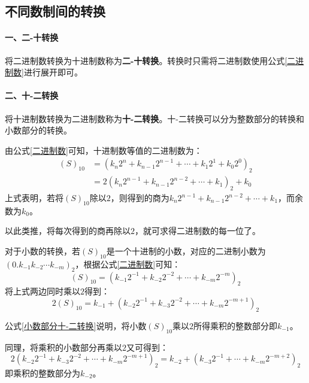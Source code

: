 \subsection{不同数制间的转换}

\paragraph{一、二-十转换}
将二进制数转换为十进制数称为\textbf{二-十转换}。转换时只需将二进制数使用公式\ref{二进制数}进行展开即可。

\paragraph{二、十-二转换}
将十进制数转换为二进制数称为\textbf{十-二转换}。十-二转换可以分为整数部分的转换和小数部分的转换。

由公式\ref{二进制数}可知，十进制数等值的二进制数为：
\begin{equation}
    \begin{aligned}
        \left( S \right)_{10} & = \left( k_{n}2^{n} + k_{n-1}2^{n-1} + \cdots + k_{1}2^{1} + k_{0}2^{0} \right)_{2} \\
                              & = 2\left( k_{n}2^{n-1} + k_{n-1}2^{n-2} + \cdots + k_{1} \right)_{2} + k_{0}
    \end{aligned}
\end{equation}
上式表明，若将$ \left( S \right)_{10} $除以$ 2 $，则得到的商为$ k_{n}2^{n-1} + k_{n-1}2^{n-2} + \cdots + k_{1} $，而余数为$ k_{0} $。

以此类推，将每次得到的商再除以$ 2 $，就可求得二进制数的每一位了。

对于小数的转换，若$ \left( S \right)_{10} $是一个十进制的小数，对应的二进制小数为$ \left( 0.k_{-1}k_{-2}\cdots k_{-m} \right)_{2} $，根据公式\ref{二进制数}可知：
\begin{equation}
    \left( S \right)_{10} = \left( k_{-1}2^{-1} + k_{-2}2^{-2} + \cdots + k_{-m}2^{-m} \right)_{2}
\end{equation}
将上式两边同时乘以$ 2 $得到：
\begin{equation}
    2\left( S \right)_{10} = k_{-1} + \left( k_{-2}2^{-1} + k_{-3}2^{-2} + \cdots + k_{-m}2^{-m+1} \right)_{2}
    \label{小数部分十-二转换}
\end{equation}

公式\ref{小数部分十-二转换}说明，将小数$ \left( S \right)_{10} $乘以$ 2 $所得乘积的整数部分即$ k_{-1} $。

同理，将乘积的小数部分再乘以$ 2 $又可得到：
\begin{equation}
    2 \left( k_{-2}2^{-1} + k_{-3}2^{-2} + \cdots + k_{-m}2^{-m+1} \right)_{2} = k_{-2} + \left( k_{-3}2^{-1} + \cdots + k_{-m}2^{-m+2} \right)_{2}
\end{equation}
即乘积的整数部分为$ k_{-2} $。

